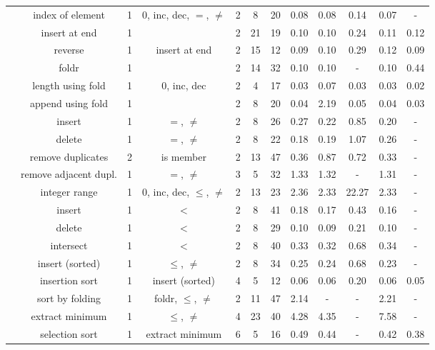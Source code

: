 \documentclass[10pt,preprint]{sigplanconf-pldi16}
\theoremstyle{definition}
\begin{document}
\begin{table*}[!htbp]
\begin{center}
{\begin{tabular}{@{} r|c| cccc | cccccc @{}}
 & index of element & 1 & 0, inc, dec, $=$, $\neq$ & 2 & 8 & 20 & 0.08 & 0.08 & 0.14 & 0.07 & - \\
 & insert at end & 1 &  & 2 & 21 & 19 & 0.10 & 0.10 & 0.24 & 0.11 & 0.12 \\
 & reverse & 1 & insert at end & 2 & 15 & 12 & 0.09 & 0.10 & 0.29 & 0.12 & 0.09 \\
 & foldr & 1 &  & 2 & 14 & 32 & 0.10 & 0.10 & - & 0.10 & 0.44 \\
 & length using fold & 1 & 0, inc, dec & 2 & 4 & 17 & 0.03 & 0.07 & 0.03 & 0.03 & 0.02 \\
 & append using fold & 1 &  & 2 & 8 & 20 & 0.04 & 2.19 & 0.05 & 0.04 & 0.03 \\
\hline\multirow{5}{*}{\parbox{1cm}{\vspace{-0.85\baselineskip}}} & insert & 1 & $=$, $\neq$ & 2 & 8 & 26 & 0.27 & 0.22 & 0.85 & 0.20 & - \\
 & delete & 1 & $=$, $\neq$ & 2 & 8 & 22 & 0.18 & 0.19 & 1.07 & 0.26 & - \\
 & remove duplicates & 2 & is member & 2 & 13 & 47 & 0.36 & 0.87 & 0.72 & 0.33 & - \\
 & remove adjacent dupl. & 1 & $=$, $\neq$ & 3 & 5 & 32 & 1.33 & 1.32 & - & 1.31 & - \\
 & integer range & 1 & 0, inc, dec, $\leq$, $\neq$ & 2 & 13 & 23 & 2.36 & 2.33 & 22.27 & 2.33 & - \\
\hline\multirow{3}{*}{\parbox{1cm}{\vspace{-0.85\baselineskip}}} & insert & 1 & $<$ & 2 & 8 & 41 & 0.18 & 0.17 & 0.43 & 0.16 & - \\
 & delete & 1 & $<$ & 2 & 8 & 29 & 0.10 & 0.09 & 0.21 & 0.10 & - \\
 & intersect & 1 & $<$ & 2 & 8 & 40 & 0.33 & 0.32 & 0.68 & 0.34 & - \\
\hline\multirow{11}{*}{\parbox{1cm}{\vspace{-0.85\baselineskip}}} & insert (sorted) & 1 & $\leq$, $\neq$ & 2 & 8 & 34 & 0.25 & 0.24 & 0.68 & 0.23 & - \\
 & insertion sort & 1 & insert (sorted) & 4 & 5 & 12 & 0.06 & 0.06 & 0.20 & 0.06 & 0.05 \\
 & sort by folding & 1 & foldr, $\leq$, $\neq$ & 2 & 11 & 47 & 2.14 & - & - & 2.21 & - \\
 & extract minimum & 1 & $\leq$, $\neq$ & 4 & 23 & 40 & 4.28 & 4.35 & - & 7.58 & - \\
 & selection sort & 1 & extract minimum & 6 & 5 & 16 & 0.49 & 0.44 & - & 0.42 & 0.38 \\

\end{tabular}}
\end{center}
\end{table*}
\end{document}
